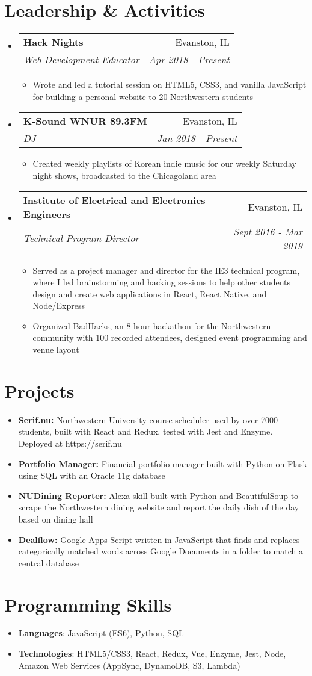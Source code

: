 \documentclass[letterpaper,11pt]{article}
\makeatletter
\newcommand{\resumeItem}[2]{
  \item\small{
    \textbf{#1}{#2 \vspace{-2pt}}
  }
}
\newcommand{\resumeSubheading}[4]{
  \vspace{-1pt}\item
    \begin{tabular*}{0.97\textwidth}{l@{\extracolsep{\fill}}r}
      \textbf{#1} & #2 \\
      \textit{\small#3} & \textit{\small #4} \\
    \end{tabular*}\vspace{-5pt}
}
\newcommand{\resumeSubItem}[2]{\resumeItem{#1}{#2}\vspace{-4pt}}
\newcommand{\resumeSubHeadingListStart}{\begin{itemize}[leftmargin=*]}
\newcommand{\resumeSubHeadingListEnd}{\end{itemize}}
\newcommand{\resumeItemListStart}{\begin{itemize}}
\newcommand{\resumeItemListEnd}{\end{itemize}\vspace{-5pt}}
\makeatother
\begin{document}
\section{Leadership \& Activities}
  \resumeSubHeadingListStart
    \resumeSubheading
      {Hack Nights}{Evanston, IL}
      {Web Development Educator}{Apr 2018 - Present}
      \resumeItemListStart
        \resumeItem{}
          {Wrote and led a tutorial session on HTML5, CSS3, and vanilla JavaScript for building a personal website to 20 Northwestern students}
      \resumeItemListEnd
    \resumeSubheading
      {K-Sound WNUR 89.3FM}{Evanston, IL}
      {DJ}{Jan 2018 - Present}
      \resumeItemListStart
        \resumeItem{}
          {Created weekly playlists of Korean indie music for our weekly Saturday night shows, broadcasted to the Chicagoland area}
        \resumeItemListEnd
    \resumeSubheading
      {Institute of Electrical and Electronics Engineers}{Evanston, IL}
      {Technical Program Director}{Sept 2016 - Mar 2019}
      \resumeItemListStart
        \resumeItem{}
          {Served as a project manager and director for the IE3 technical program, where I led brainstorming and hacking sessions to help other students design and create web applications in React, React Native, and Node/Express}
        \resumeItem{}
          {Organized BadHacks, an 8-hour hackathon for the Northwestern community with 100 recorded attendees, designed event programming and venue layout}      
      \resumeItemListEnd
    \resumeSubHeadingListEnd

\section{Projects}
  \resumeSubHeadingListStart
    \resumeSubItem{Serif.nu: }
      {Northwestern University course scheduler used by over 7000 students, built with React and Redux, tested with Jest and Enzyme. Deployed at https://serif.nu}
    \resumeSubItem{Portfolio Manager: }
      {Financial portfolio manager built with Python on Flask using SQL with an Oracle 11g database}
    \resumeSubItem{NUDining Reporter: }
      {Alexa skill built with Python and BeautifulSoup to scrape the Northwestern dining website and report the daily dish of the day based on dining hall}
    \resumeSubItem{Dealflow: }
      {Google Apps Script written in JavaScript that finds and replaces categorically matched words across Google Documents in a folder to match a central database}
  \resumeSubHeadingListEnd

%
\section{Programming Skills}
 \resumeSubHeadingListStart
   \item{
     \textbf{Languages}{: JavaScript (ES6), Python, SQL }
   }
   \item{
    \textbf{Technologies}{: HTML5/CSS3, React, Redux, Vue, Enzyme, Jest, Node, Amazon Web Services (AppSync, DynamoDB, S3, Lambda)}
   }
 \resumeSubHeadingListEnd


\end{document}
